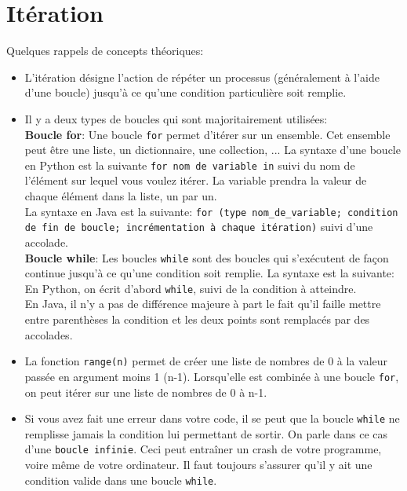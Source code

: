     \section{Itération}
    
    Quelques rappels de concepts théoriques: \\
    
    \begin{itemize}
    	\item L'itération désigne l'action de répéter un processus (généralement à l'aide d'une boucle) jusqu'à ce qu'une condition particulière soit remplie.
    	\item Il y a deux types de boucles qui sont majoritairement utilisées: \\
    	
    	\textbf{Boucle for}: Une boucle \lstinline{for} permet d'itérer sur un ensemble. Cet ensemble peut être une liste, un dictionnaire, une collection, ... La syntaxe d'une boucle en Python est la suivante \lstinline{for nom de variable in} suivi du nom de l'élément sur lequel vous voulez itérer. La variable prendra la valeur de chaque élément dans la liste, un par un. \\
    	
    	
             	
     	La syntaxe en Java est la suivante: \lstinline{for (type nom_de_variable; condition de fin de boucle; incrémentation à chaque itération)} suivi d'une accolade. \\
     	
        	 
        \textbf{Boucle while}: Les boucles \lstinline{while} sont des boucles qui s'exécutent de façon continue jusqu'à ce qu'une condition soit remplie. La syntaxe est la suivante: En Python, on écrit d'abord \lstinline{while}, suivi de la condition à atteindre.\\
     	
     	En Java, il n'y a pas de différence majeure à part le fait qu'il faille mettre entre parenthèses la condition et les deux points sont remplacés par des accolades. \\
     	
     	
     	\item La fonction \lstinline{range(n)} permet de créer une liste de nombres de 0 à la valeur passée en argument moins 1 (n-1). Lorsqu'elle est combinée à une boucle \lstinline{for}, on peut itérer sur une liste de nombres de 0 à n-1. \\
     	
     	\item Si vous avez fait une erreur dans votre code, il se peut que la boucle \lstinline{while} ne remplisse jamais la condition lui permettant de sortir. On parle dans ce cas d'une \lstinline{boucle infinie}. Ceci peut entraîner un crash de votre programme, voire même de votre ordinateur. Il faut toujours s'assurer qu'il y ait une condition valide dans une boucle \lstinline{while}. \\\\
     	
     	\end{itemize}
     	
